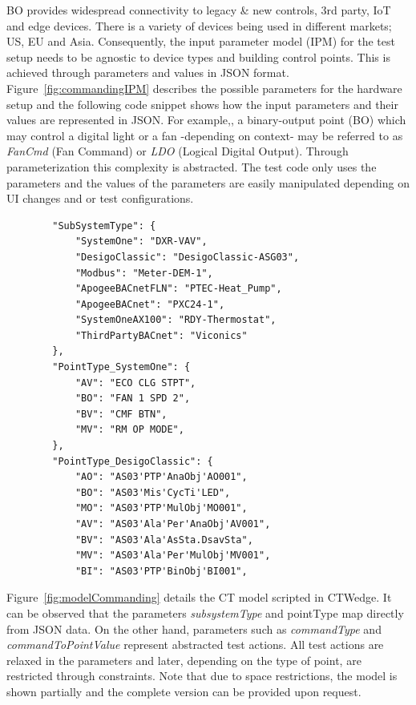 \documentclass[conference]{IEEEtran}
\begin{document}
	BO provides widespread connectivity to legacy \& new controls, 3rd party, IoT and edge devices. There is a variety of devices being used in different markets; US, EU and Asia. 
	Consequently, the input parameter model (IPM) for the test setup needs to be agnostic to device types and building control points.
	This is achieved through parameters and values in JSON format.
	Figure~\ref{fig:commandingIPM} describes the possible parameters for the hardware setup and the following code snippet shows how the input parameters and their values are represented in JSON. 
	For example,, a binary-output point (BO) which may control a digital light or a fan -depending on context- may be referred to as \textit{FanCmd} (Fan Command) or \textit{LDO} (Logical Digital Output).
  Through parameterization this complexity is abstracted. The test code only uses the parameters and the values of the parameters are easily manipulated depending on UI changes and or test configurations.
	\begin{lstlisting}
		"SubSystemType": {
			"SystemOne": "DXR-VAV",
			"DesigoClassic": "DesigoClassic-ASG03",
			"Modbus": "Meter-DEM-1",
			"ApogeeBACnetFLN": "PTEC-Heat_Pump",
			"ApogeeBACnet": "PXC24-1",
			"SystemOneAX100": "RDY-Thermostat",
			"ThirdPartyBACnet": "Viconics"
		},
		"PointType_SystemOne": {
			"AV": "ECO CLG STPT",
			"BO": "FAN 1 SPD 2",
			"BV": "CMF BTN",
			"MV": "RM OP MODE",
		},
		"PointType_DesigoClassic": {
			"AO": "AS03'PTP'AnaObj'AO001",
			"BO": "AS03'Mis'CycTi'LED",
			"MO": "AS03'PTP'MulObj'MO001",
			"AV": "AS03'Ala'Per'AnaObj'AV001",
			"BV": "AS03'Ala'AsSta.DsavSta",
			"MV": "AS03'Ala'Per'MulObj'MV001",
			"BI": "AS03'PTP'BinObj'BI001",	
	\end{lstlisting}

	
	Figure~\ref{fig:modelCommanding} details the CT model scripted in CTWedge.
	It can be observed that the parameters \emph{subsystemType} and \emph{}{pointType} map directly from JSON data.
	On the other hand, parameters such as \emph{commandType} and \emph{commandToPointValue} represent abstracted test actions.
	All test actions are relaxed in the parameters and later, depending on the type of point, are restricted through constraints.
	Note that due to space restrictions, the model is shown partially and the complete version can be provided upon request.
	
\end{document}
